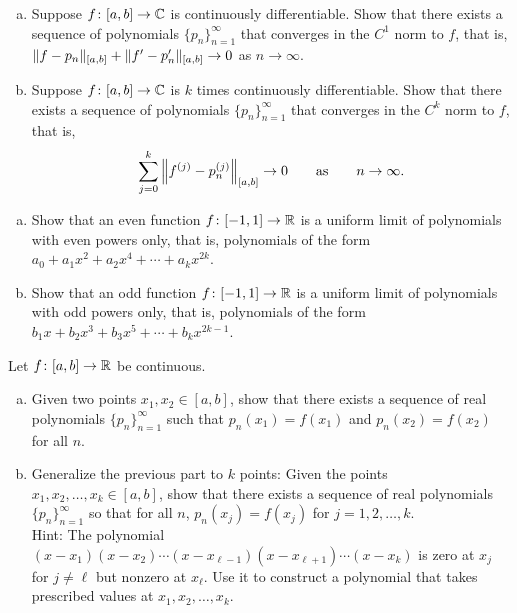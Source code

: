 \begin{exercise}
\pagebreak[2]
\leavevmode
\begin{enumerate}[a)]
\item
Suppose $f \colon [a,b] \to {\mathbb{C}}$ is continuously 
differentiable.  Show that there exists a sequence of polynomials
$\{ p_n \}_{n=1}^\infty$
that converges in the $C^1$ norm to $f$, that is,
$\lVert {f - p_n} \rVert_{[a,b]} + \lVert {f'-p_n'} \rVert_{[a,b]} \to 0$ as $n \to \infty$.
\item
Suppose $f \colon [a,b] \to {\mathbb{C}}$ is $k$ times continuously 
differentiable.  Show that there exists a sequence of polynomials
$\{ p_n \}_{n=1}^\infty$
that converges in the $C^k$ norm to $f$, that is,
\begin{equation*}
\sum_{j=0}^k \left\lVert {f^{(j)} - p_n^{(j)}} \right\rVert_{[a,b]} \to 0 \qquad \text{as} \qquad
n \to \infty.
\end{equation*}
\end{enumerate}
\end{exercise}

\begin{exercise}
\pagebreak[2]
\leavevmode
\begin{enumerate}[a)]
\item
Show that an even function $f \colon [-1,1] \to {\mathbb{R}}$ is a uniform
limit of polynomials with even powers only, that is, polynomials
of the form $a_0 + a_1 x^2 + a_2 x^4 + \cdots + a_k x^{2k}$.
\item
Show that an odd function $f \colon [-1,1] \to {\mathbb{R}}$ is a uniform
limit of polynomials with odd powers only, that is, polynomials
of the form $b_1 x + b_2 x^3 + b_3 x^5 + \cdots + b_k x^{2k-1}$.
\end{enumerate}
\end{exercise}

\begin{exercise} \label{exercise:finitelymanyweierequal}
\pagebreak[2]
Let $f \colon [a,b] \to {\mathbb{R}}$ be continuous.
\begin{enumerate}[a)]
\item
Given two points $x_1,x_2 \in [a,b]$, show that
there exists a sequence of real polynomials $\{ p_n \}_{n=1}^\infty$
such that $p_n(x_1) = f(x_1)$ and $p_n(x_2) = f(x_2)$ for all $n$.
\item
Generalize the previous part to $k$ points:
Given the points $x_1,x_2,\ldots,x_k \in [a,b]$, show that
there exists a sequence of real polynomials $\{ p_n \}_{n=1}^\infty$
so that for all $n$, $p_n(x_j) = f(x_j)$ for $j=1,2,\ldots,k$.
\\
Hint: The polynomial $(x-x_1)(x-x_2)\cdots(x-x_{\ell-1})(x-x_{\ell+1})
\cdots(x-x_k)$ is zero at $x_j$ for $j \neq \ell$ but nonzero at
$x_\ell$.  Use it to construct a polynomial that takes prescribed values
at $x_1,x_2,\ldots,x_k$.
\end{enumerate}
\end{exercise}


